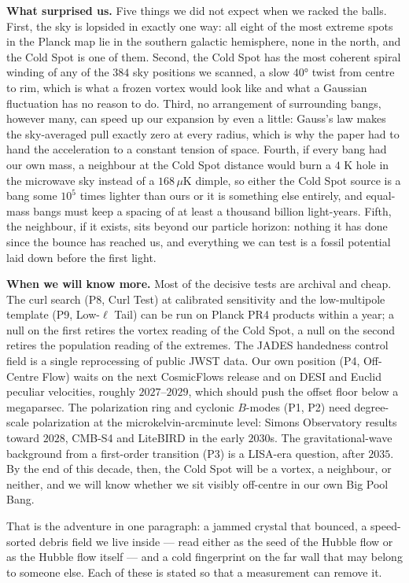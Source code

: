 \documentclass[
]{article}
\begin{document}
\textbf{What surprised us.} Five things we did not expect when we racked
the balls. First, the sky is lopsided in exactly one way: all eight of
the most extreme spots in the Planck map lie in the southern galactic
hemisphere, none in the north, and the Cold Spot is one of them. Second,
the Cold Spot has the most coherent spiral winding of any of the \(384\)
sky positions we scanned, a slow \(40°\) twist from centre to rim, which
is what a frozen vortex would look like and what a Gaussian fluctuation
has no reason to do. Third, no arrangement of surrounding bangs, however
many, can speed up our expansion by even a little: Gauss's law makes the
sky-averaged pull exactly zero at every radius, which is why the paper
had to hand the acceleration to a constant tension of space. Fourth, if
every bang had our own mass, a neighbour at the Cold Spot distance would
burn a \(4\) K hole in the microwave sky instead of a \(168\,\mu\)K
dimple, so either the Cold Spot source is a bang some \(10^{5}\) times
lighter than ours or it is something else entirely, and equal-mass bangs
must keep a spacing of at least a thousand billion light-years. Fifth,
the neighbour, if it exists, sits beyond our particle horizon: nothing
it has done since the bounce has reached us, and everything we can test
is a fossil potential laid down before the first light.

\textbf{When we will know more.} Most of the decisive tests are archival
and cheap. The curl search (P8, Curl Test) at calibrated sensitivity and
the low-multipole template (P9, Low-\(\ell\) Tail) can be run on Planck
PR4 products within a year; a null on the first retires the vortex
reading of the Cold Spot, a null on the second retires the population
reading of the extremes. The JADES handedness control field is a single
reprocessing of public JWST data. Our own position (P4, Off-Centre Flow)
waits on the next CosmicFlows release and on DESI and Euclid peculiar
velocities, roughly \(2027\)--\(2029\), which should push the offset
floor below a megaparsec. The polarization ring and cyclonic \(B\)-modes
(P1, P2) need degree-scale polarization at the microkelvin-arcminute
level: Simons Observatory results toward \(2028\), CMB-S4 and LiteBIRD
in the early \(2030\)s. The gravitational-wave background from a
first-order transition (P3) is a LISA-era question, after \(2035\). By
the end of this decade, then, the Cold Spot will be a vortex, a
neighbour, or neither, and we will know whether we sit visibly
off-centre in our own Big Pool Bang.

That is the adventure in one paragraph: a jammed crystal that bounced, a
speed-sorted debris field we live inside --- read either as the seed of
the Hubble flow or as the Hubble flow itself --- and a cold fingerprint
on the far wall that may belong to someone else. Each of these is stated
so that a measurement can remove it.
\end{document}
